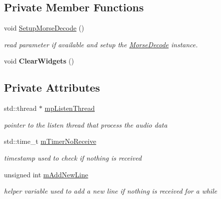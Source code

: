 \subsection*{Private Member Functions}
\begin{DoxyCompactItemize}
\item 
\mbox{\label{classMainDialog_ada04a88fdfc5b3b0921e26f23f7f1fc4}} 
void \hyperlink{classMainDialog_ada04a88fdfc5b3b0921e26f23f7f1fc4}{Setup\+Morse\+Decode} ()
\begin{DoxyCompactList}\small\item\em read parameter if available and setup the \hyperlink{classMorseDecode}{Morse\+Decode} instance. \end{DoxyCompactList}\item 
\mbox{\label{classMainDialog_acd93dbfb870680e4dff510d88f1d3125}} 
void {\bfseries Clear\+Widgets} ()
\end{DoxyCompactItemize}
\subsection*{Private Attributes}
\begin{DoxyCompactItemize}
\item 
\mbox{\label{classMainDialog_af4537bbf090137035880a13f50cb9789}} 
std\+::thread $\ast$ \hyperlink{classMainDialog_af4537bbf090137035880a13f50cb9789}{mp\+Listen\+Thread}
\begin{DoxyCompactList}\small\item\em pointer to the listen thread that process the audio data \end{DoxyCompactList}\item 
\mbox{\label{classMainDialog_ae61ec8f7594554de53ccbf6fea4e7493}} 
std\+::time\+\_\+t \hyperlink{classMainDialog_ae61ec8f7594554de53ccbf6fea4e7493}{m\+Timer\+No\+Receive}
\begin{DoxyCompactList}\small\item\em timestamp used to check if nothing is received \end{DoxyCompactList}\item 
\mbox{\label{classMainDialog_a9abeb88ddd08e9f442ff3be153a8e6c4}} 
unsigned int \hyperlink{classMainDialog_a9abeb88ddd08e9f442ff3be153a8e6c4}{m\+Add\+New\+Line}
\begin{DoxyCompactList}\small\item\em helper variable used to add a new line if nothing is received for a while \end{DoxyCompactList}\end{DoxyCompactItemize}
